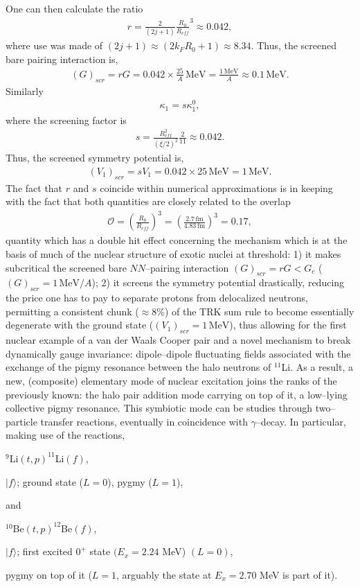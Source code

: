 \begin{subappendices}
 
  One can then calculate the ratio
    \begin{align*}
r=\frac{2}{(2j+1)}\frac{R_0}{R_{eff}}^3\approx 0.042,
   \end{align*}
 where use was made of $(2j+1)\approx (2k_FR_0+1)\approx 8.34$. Thus, the screened bare pairing interaction is,
\begin{align*}
(G)_{scr}=rG=0.042\times\frac{25}{A}\, \text{MeV}=\frac{1\,\text{MeV}}{A}\approx 0.1\,\text{MeV}.
\end{align*}
 Similarly
 \begin{align*}
\kappa_1=s\kappa_1^0,
 \end{align*}
 where the screening factor is 
  \begin{align*}
s=\frac{R_{eff}^2}{\left(\xi/2\right)^2}\frac{2}{11}\approx 0.042.
  \end{align*}
Thus, the screened symmetry potential is,
  \begin{align*}
(V_1)_{scr}=sV_1=0.042\times 25\, \text{MeV}=1\,\text{MeV}.
  \end{align*}
The fact that $r$ and $s$ coincide within numerical approximations is in keeping with the fact that both quantities are closely related to the overlap
  \begin{align*}
\mathscr{O}=\left(\frac{R_0}{R_{eff}}\right)^3=\left(\frac{2.7\,\text{fm}}{4.83\,\text{fm}}\right)^3=0.17,
  \end{align*}
quantity which has a double hit effect concerning the mechanism which is at the basis of much of the nuclear structure of exotic nuclei at threshold: 1) it makes subcritical the screened bare $NN$--pairing interaction $(G)_{scr}=rG<G_c$ ($(G)_{scr}=1\,\text{MeV}/A$); 2) it screens the symmetry potential drastically, reducing the price one has to pay to separate protons from delocalized neutrons, permitting a consistent chunk ($\approx 8$\%) of the TRK sum rule to  become essentially degenerate with the  ground state ($(V_1)_{scr}=1 \,\text{MeV}$), thus allowing for the first nuclear example of a van der Waals Cooper pair and a novel mechanism to break dynamically gauge invariance: dipole--dipole fluctuating fields associated with the exchange of the pigmy resonance between the halo neutrons of $^{11}$Li. As a result, a new, (composite) elementary mode of nuclear excitation joins the ranks of the previously known: the halo pair addition mode carrying on top of it, a low--lying collective pigmy resonance. This symbiotic mode can be studies through two--particle transfer reactions, eventually in coincidence with $\gamma$--decay. In particular, making use of the reactions,\vspace{0.2cm}
\centerline{$^{9}$Li$(t,p)^{11}$Li$(f)$,}
\vspace{0.2cm}
\centerline{$|f\rangle$; ground state ($L=0$), pygmy ($L=1$),}
\vspace{0.3cm}
and\\
\vspace{0.3cm}
\centerline{$^{10}$Be$(t,p)^{12}$Be$(f)$,}
\vspace{0.2cm}
\centerline{$|f\rangle$; first excited $0^+$ state $(E_x=2.24$ MeV) $(L=0)$,}
\vspace{0.2cm}
\centerline{ pygmy on top of it ($L=1$, arguably the state at $E_x=2.70$ MeV is part of it).}

\end{subappendices}
